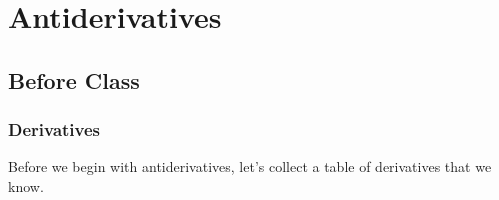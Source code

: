 \documentclass[notes]{subfiles}
\begin{document}
	\setcounter{section}{9}
	\fancyhead[LO,RE]{\bfseries \currentname}
	\fancyfoot[C]{{}}
	\fancyfoot[RO,LE]{\large \thepage}	%
	
\section*{Antiderivatives}\label{cs39}
	\subsection*{Before Class}
	\subsubsection*{Derivatives}
		Before we begin with antiderivatives, let's collect a table of derivatives that we know.
\end{document}
